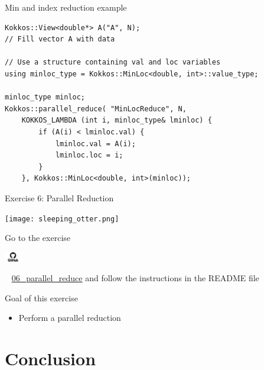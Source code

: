 \documentclass[aspectratio=169]{beamer}
\newcommand{\githublink}[2][2em]{%
    \hspace{-0.25em}%
    \parbox[c][#1][c]{#1}{%
        \includegraphics[width=#1]{GitHub-logo.png}%
    }%
    \hspace{-0.25em}%
    ~%
    #2%
}
\begin{document}

\begin{frame}[fragile]{Min and index reduction example}
    \begin{verbatim}
Kokkos::View<double*> A("A", N);
// Fill vector A with data

// Use a structure containing val and loc variables
using minloc_type = Kokkos::MinLoc<double, int>::value_type;

minloc_type minloc;
Kokkos::parallel_reduce( "MinLocReduce", N,
    KOKKOS_LAMBDA (int i, minloc_type& lminloc) {
        if (A(i) < lminloc.val) {
            lminloc.val = A(i);
            lminloc.loc = i;
        }
    }, Kokkos::MinLoc<double, int>(minloc));
    \end{verbatim}
\end{frame}


\begin{frame}{Exercise 6: Parallel Reduction}
    \begin{center}
        \texttt{[image: sleeping\_otter.png]}
    \end{center}

    Go to the exercise \githublink{\href{https://github.com/CExA-project/cexa-kokkos-tutorials/tree/main/exercises/06_parallel_reduce}{06\_parallel\_reduce}} and follow the instructions in the README file

    \begin{block}{Goal of this exercise}
        \begin{itemize}
            \item Perform a parallel reduction
        \end{itemize}
    \end{block}
\end{frame}


\section[Conclusion]{Conclusion}

\end{document}
